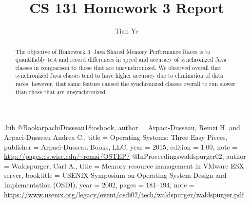 \usepackage{filecontents}

\begin{filecontents}{\jobname.bib}
@Book{arpachiDusseau18:osbook,
  author =       {Arpaci-Dusseau, Remzi H. and Arpaci-Dusseau Andrea C.},
  title =        {Operating Systems: Three Easy Pieces},
  publisher =    {Arpaci-Dusseau Books, LLC},
  year =         2015,
  edition =      {1.00},
  note =         {\url{http://pages.cs.wisc.edu/~remzi/OSTEP/}}
}
@InProceedings{waldspurger02,
  author =       {Waldspurger, Carl A.},
  title =        {Memory resource management in {VMware ESX} server},
  booktitle =    {USENIX Symposium on Operating System Design and
                  Implementation (OSDI)},
  year =         2002,
  pages =        {181--194},
  note =         {\url{https://www.usenix.org/legacy/event/osdi02/tech/waldspurger/waldspurger.pdf}}}
\end{filecontents}



\date{}

\title{\Large \bf CS 131 Homework 3 Report}

\author{
{\rm Tian Ye}\\
} %

\maketitle

\begin{abstract}
The objective of Homework 3: Java Shared Memory Performance Races is to quantifiably 
test and record differences in speed and accuracy of synchronized Java classes in comparison
to those that are unsynchronized. We observed overall that synchronized Java classes tend to
have higher accuracy due to elimination of data races; however, that same feature caused the
synchronized classes overall to run slower than those that are unsynchronized.
\end{abstract}


